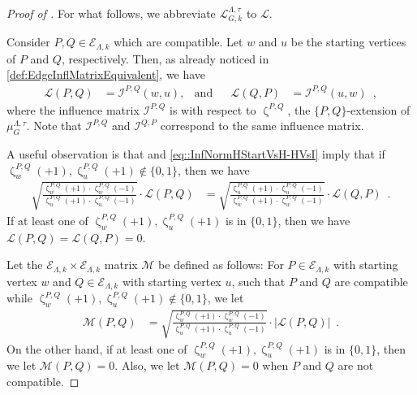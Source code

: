 \documentclass[11pt,reqno]{amsart}
\numberwithin{equation}{section}
\newcommand{\cE}{{\mathcal{E}}}
\newcommand{\cI}{{\mathcal{I}}}
\newcommand{\cL}{{\mathcal{L}}}
\newcommand{\cM}{{\mathcal{M}}}
\newcommand{\applegreen}[1]{ {\color{applegreen}#1}}
\newcommand{\amethyst}[1]{{\color{amethyst}#1} }
\newcommand{\blue}[1]{{\color{blue}#1}}
\newcommand{\bluepigment}[1]{{\color{blue(pigment)}#1}}
\newcommand{\goldenbrown}[1]{{\color{goldenbrown}#1}}
\newcommand{\iris}[1]{{\color{iris}#1}}
\newcommand{\red}[1]{{\color{red}#1}}
\newcommand{\rosegold}[1]{{\color{rosegold}#1}}
\newcommand{\ExtV}{\iris{\cE}}
\newcommand{\infmatrix}{\cI}
\newcommand{\abs}[1]{\blue{|}#1\blue{|}}
\renewcommand{\applegreen}[1]{#1}
\renewcommand{\amethyst}[1]{#1}
\renewcommand{\blue}[1]{#1}
\renewcommand{\bluepigment}[1]{#1}
\renewcommand{\goldenbrown}[1]{#1}
\renewcommand{\iris}[1]{#1}
\renewcommand{\red}[1]{#1}
\renewcommand{\rosegold}[1]{#1}
\newcommand{\kk}{\bluepigment{k}}
\newcommand{\kP}{\goldenbrown{P}}
\newcommand{\kQ}{\amethyst{Q}}
\newcommand{\ku}{\red{u}}
\newcommand{\kw}{\blue{w}}
\renewcommand{\kk}{k}
\renewcommand{\kP}{P}
\renewcommand{\kQ}{Q}
\renewcommand{\ku}{u}
\renewcommand{\kw}{w}
\newcommand{\ExtdInfMatrix}{\rosegold{\cL}}
\newcommand{\ExtdInfMatrixF}{\applegreen{\cL}^{\Lambda,\tau}_{G,\kk}}
\begin{document}
\begin{proof}[Proof of ]
For what follows, we abbreviate $\ExtdInfMatrixF$ to $\ExtdInfMatrix$. 

Consider $\kP, \kQ\in \ExtV_{\Lambda,\kk}$ which are compatible. 
Let $\kw$ and $\ku$ be the starting vertices of $\kP$ and $\kQ$, respectively. 
%
Then, as already noticed in \eqref{def:EdgeInflMatrixEquivalent}, we have 
\begin{align}\label{eq::InfNormHStartVsH-HVsI}
\ExtdInfMatrix(\kP,\kQ)&=\infmatrix^{\kP,\kQ}(\kw,\ku), 
& \textrm{and} && 
\ExtdInfMatrix(\kQ,\kP)&=\infmatrix^{\kP,\kQ}(\ku, \kw)\enspace, 
\end{align}
where the influence matrix $\infmatrix^{\kP,\kQ}$ is with respect to $\upzeta^{\kP,\kQ}$, the 
$\{\kP, \kQ\}$-extension of $\mu^{\Lambda,\tau}_G$. Note that $\infmatrix^{\kP,\kQ}$ and
$\infmatrix^{\kQ,\kP}$ correspond to the same influence matrix. 

A useful observation is that  and \eqref{eq::InfNormHStartVsH-HVsI} imply that
if $\upzeta^{\kP,\kQ}_{\kw}(+1), \upzeta^{\kP,\kQ}_{\ku}(+1)\notin \{0,1\}$, then we have 
\begin{align}\label{eq::InfNormHStartVsH-HVsIBB}
\sqrt{
\frac{\upzeta^{\kP,\kQ}_{\kw}(+1) \cdot \upzeta^{\kP,\kQ}_{\kw}(-1)} 
{\upzeta^{\kP,\kQ}_{\ku}(+1) \cdot \upzeta^{\kP,\kQ}_{\ku}(-1) }
}\cdot
%
\ExtdInfMatrix(\kP,\kQ)&= 
\sqrt{\frac{\upzeta^{\kP,\kQ}_{\ku}(+1) \cdot \upzeta^{\kP,\kQ}_{\ku}(-1)}
{\upzeta^{\kP,\kQ}_{\kw}(+1) \cdot \upzeta^{\kP,\kQ}_{\kw}(-1)} }
\cdot 
\ExtdInfMatrix(\kQ,\kP)\enspace.
\end{align}
%
If at least one of $\upzeta^{\kP,\kQ}_{\kw}(+1), \upzeta^{\kP,\kQ}_{\ku}(+1)$ is in $\{0,1\}$, 
then we have $\ExtdInfMatrix(\kP,\kQ)=\ExtdInfMatrix(\kQ,\kP)=0$. 



Let the $\ExtV_{\Lambda,\kk}\times \ExtV_{\Lambda,\kk}$ matrix $\cM$ be defined as follows:
%
For  $\kP \in \ExtV_{\Lambda,\kk}$ with starting vertex $\kw$ and 
$\kQ \in \ExtV_{\Lambda,\kk}$ with starting vertex $\ku$, such that $\kP$ and $\kQ$
are compatible while 
% 
 $\upzeta^{\kP,\kQ}_{\kw}(+1), \upzeta^{\kP,\kQ}_{\ku}(+1)\notin \{0,1\}$, we let 
\begin{align}\label{eq:DefOfHatL}
\cM(\kP,\kQ)&=
\sqrt{
\frac{\upzeta^{\kP,\kQ}_{\kw}(+1) \cdot \upzeta^{\kP,\kQ}_{\kw}(-1)} 
{\upzeta^{\kP,\kQ}_{\ku}(+1) \cdot \upzeta^{\kP,\kQ}_{\ku}(-1) }
}
\cdot
%
\abs{\ExtdInfMatrix(\kP, \kQ)} \enspace. 
\end{align}
On the other hand, if at least one of $\upzeta^{\kP,\kQ}_{\kw}(+1), \upzeta^{\kP,\kQ}_{\ku}(+1)$ is in $\{0,1\}$, 
 then we let $\cM(\kP,\kQ)=0$. Also, we let  $\cM(\kP,\kQ)=0$ when $\kP$ and $\kQ$ are not compatible. 
%




\end{proof}
\end{document}
